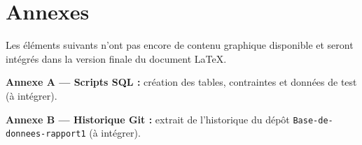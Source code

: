 \documentclass[11pt,a4paper]{article}
\begin{document}
\section*{Annexes}
Les \'el\'ements suivants n'ont pas encore de contenu graphique disponible et seront int\'egr\'es dans la version finale du document \LaTeX{}.

\textbf{Annexe A --- Scripts SQL :} cr\'eation des tables, contraintes et donn\'ees de test (\`a int\'egrer).

% 

\textbf{Annexe B --- Historique Git :} extrait de l'historique du d\'ep\^ot \texttt{Base-de-donnees-rapport1} (\`a int\'egrer).
\end{document}
